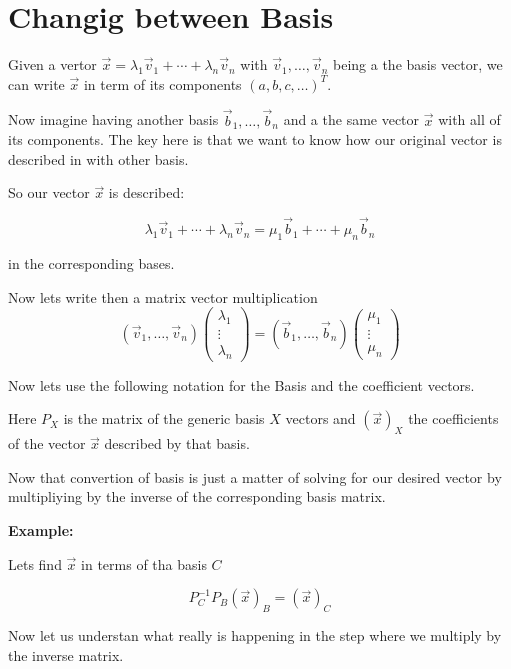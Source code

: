 \section{Changig between Basis}

Given a vertor \(\vec{x} = \lambda_1 \vec{v}_1 + \cdots + \lambda_n \vec{v}_n\) 
with \(\vec{v}_1, \dots, \vec{v}_n\)
being a the basis vector, we can write \(\vec{x}\) in term of its components \((a, b, c, \dots)^T\).

Now imagine having another basis \(\vec{b}_1, \dots, \vec{b}_n\) and a the same vector \(\vec{x}\)
with all of its components. The key here is that we want to know how our original
vector is described in with other basis.

So our vector \(\vec{x}\) is described:

\[\lambda_1 \vec{v}_1 + \cdots + \lambda_n \vec{v}_n = \mu_1 \vec{b}_1 + \cdots + \mu_n \vec{b}_n\]

in the corresponding bases.

Now lets write then a matrix vector multiplication
\[
(\vec{v}_1, \dots, \vec{v}_ n) 
\begin{pmatrix} \lambda_1 \\ \vdots \\ \lambda_n \end{pmatrix}
 =
(\vec{b}_1, \dots, \vec{b}_ n) 
\begin{pmatrix} \mu_1 \\ \vdots \\ \mu_n \end{pmatrix}
\]

Now lets use the following notation for the Basis and the coefficient vectors.

\begin{center}
\end{center}

Here \(P_{X}\) is the matrix of the generic basis \(X\) vectors and \((\vec{x})_X\) the coefficients of the
vector \(\vec{x}\) described by that basis.

Now that convertion of basis is just a matter of solving for 
our desired vector by multipliying
by the inverse of the corresponding basis matrix.

\textbf{Example:}

Lets find \(\vec{x}\) in terms of tha basis \(C\)

\[P_{C}^{-1} P_B (\vec{x})_B = (\vec{x})_C\]

Now let us understan what really is happening in the step where we multiply by the inverse matrix.

